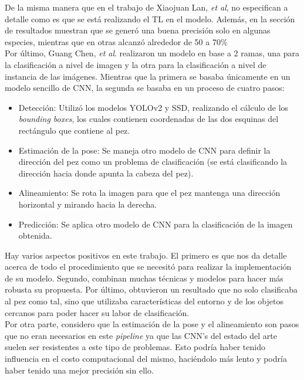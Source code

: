 De la misma manera que en el trabajo de Xiaojuan Lan, \textit{et al}, no especifican a detalle 
como es que se está realizando el TL en el modelo. Además, en la sección de resultados 
muestran que se generó una buena precisión solo en algunas especies, mientras que en otras 
alcanzó alrededor de 50 a 70\% \\

Por último, Guang Chen, \textit{et al}. \cite{8371919} realizaron un modelo en base a 2 ramas, 
una para la clasificación a nivel de imagen y la otra para la clasificación a nivel de instancia 
de las imágenes. Mientras que la primera se basaba únicamente en un modelo sencillo de CNN, la 
segunda se basaba en un proceso de cuatro pasos:
\begin{itemize}
    \item Detección: Utilizó los modelos YOLOv2 y SSD, realizando el cálculo de los \textit{bounding boxes}, los cuales contienen coordenadas de las dos esquinas del rectángulo que contiene al pez.
    \item Estimación de la pose: Se maneja otro modelo de CNN para definir la dirección del pez como un problema de clasificación (se está clasificando la dirección hacia donde apunta la cabeza del pez).
    \item Alineamiento: Se rota la imagen para que el pez mantenga una dirección horizontal y mirando hacia la derecha.
    \item Predicción: Se aplica otro modelo de CNN para la clasificación de la imagen obtenida.
\end{itemize}
Hay varios aspectos positivos en este trabajo. El primero es que nos da detalle acerca de todo 
el procedimiento que se necesitó para realizar la implementación de su modelo. Segundo, combinan 
muchas técnicas y modelos para hacer más robusta su propuesta. Por último, obtuvieron un resultado 
que no solo clasificaba al pez como tal, sino que utilizaba características del entorno y de los 
objetos cercanos para poder hacer su labor de clasificación. \\

Por otra parte, considero que la estimación de la pose y el alineamiento son pasos que no eran 
necesarios en este \textit{pipeline} ya que las CNN's del estado del arte suelen ser resistentes 
a este tipo de problemas. Esto podría haber tenido influencia en el costo computacional del mismo, 
haciéndolo más lento y podría haber tenido una mejor precisión sin ello. \\

